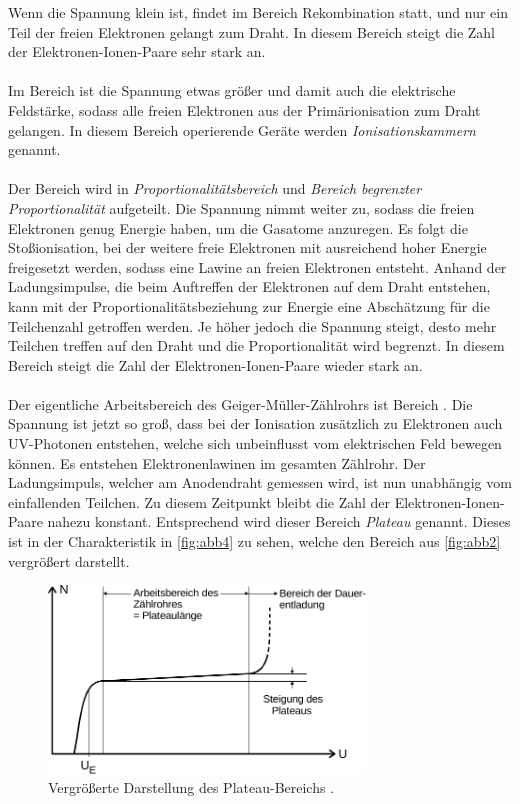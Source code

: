     Wenn die Spannung klein ist, findet im Bereich  Rekombination statt,
    und nur ein Teil der freien Elektronen gelangt zum Draht.
    In diesem Bereich steigt die Zahl der Elektronen-Ionen-Paare sehr stark an.\\
    \\
    Im Bereich  ist die Spannung etwas größer und damit auch die elektrische Feldstärke,
    sodass alle freien Elektronen aus der Primärionisation zum Draht gelangen.
    In diesem Bereich operierende Geräte werden \textit{Ionisationskammern} genannt.\\
    \\
    Der Bereich  wird in \textit{Proportionalitätsbereich} und \textit{Bereich begrenzter Proportionalität} aufgeteilt.
    Die Spannung nimmt weiter zu, sodass die freien Elektronen genug Energie haben,
    um die Gasatome anzuregen.
    Es folgt die Stoßionisation, bei der weitere freie
    Elektronen mit ausreichend hoher Energie freigesetzt werden,
    sodass eine Lawine an freien Elektronen entsteht.
    Anhand der Ladungsimpulse, die beim Auftreffen der Elektronen auf dem Draht entstehen,
    kann mit der Proportionalitätsbeziehung zur Energie
    eine Abschätzung für die Teilchenzahl getroffen werden.
    Je höher jedoch die Spannung steigt,
    desto mehr Teilchen treffen auf den Draht und die Proportionalität wird begrenzt.
    In diesem Bereich steigt die Zahl der Elektronen-Ionen-Paare wieder stark an.\\
    \\
    Der eigentliche Arbeitsbereich des Geiger-Müller-Zählrohrs ist Bereich .
    Die Spannung ist jetzt so groß,
    dass bei der Ionisation zusätzlich zu Elektronen auch UV-Photonen entstehen,
    welche sich unbeinflusst vom elektrischen Feld bewegen können.
    Es entstehen Elektronenlawinen im gesamten Zählrohr.
    Der Ladungsimpuls, welcher am Anodendraht gemessen wird, ist nun unabhängig vom einfallenden Teilchen.
    Zu diesem Zeitpunkt bleibt die Zahl der Elektronen-Ionen-Paare nahezu konstant.
    Entsprechend wird dieser Bereich \textit{Plateau} genannt.
    Dieses ist in der Charakteristik in \autoref{fig:abb4} zu sehen,
    welche den Bereich  aus \autoref{fig:abb2} vergrößert darstellt.

    \begin{figure}
      \centering
      \includegraphics[width=0.75\textwidth]{content/img/Abb_4.pdf}
      \caption{Vergrößerte Darstellung des Plateau-Bereichs \cite{versuchsanleitung}.}
      \label{fig:abb4}
    \end{figure}

